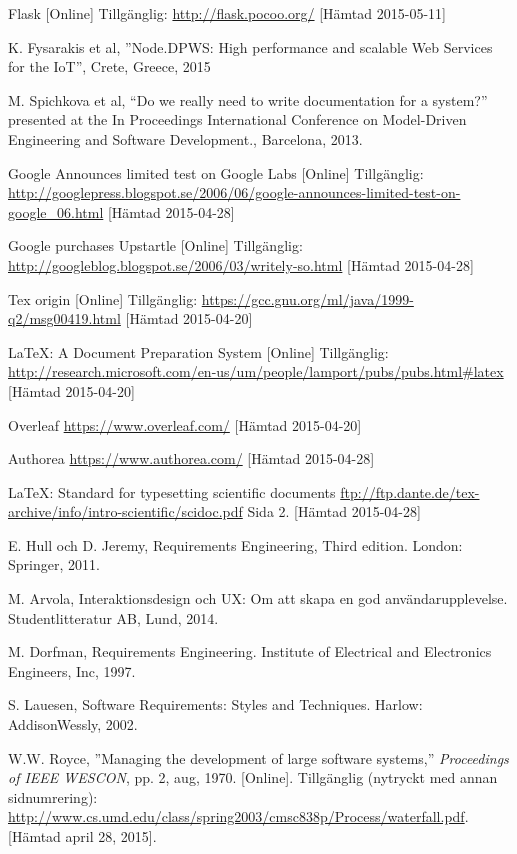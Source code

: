 \begin{thebibliography}{9}
Flask [Online] Tillgänglig:
\url{http://flask.pocoo.org/}
[Hämtad 2015-05-11]
	
K. Fysarakis et al, ''Node.DPWS: High performance and scalable Web Services for the IoT'', Crete, Greece, 2015


M. Spichkova et al, “Do we really need to write documentation for a system?” presented at the In Proceedings International Conference on Model-Driven Engineering and Software Development., Barcelona, 2013.

Google Announces limited test on Google Labs [Online] Tillgänglig: 
\url{http://googlepress.blogspot.se/2006/06/google-announces-limited-test-on-google_06.html} [Hämtad 2015-04-28]

Google purchases Upstartle [Online] Tillgänglig: 
\url{http://googleblog.blogspot.se/2006/03/writely-so.html} [Hämtad 2015-04-28]

Tex origin [Online] Tillgänglig: 
\url{https://gcc.gnu.org/ml/java/1999-q2/msg00419.html} [Hämtad 2015-04-20]

LaTeX: A Document Preparation System [Online] Tillgänglig: 
\url{http://research.microsoft.com/en-us/um/people/lamport/pubs/pubs.html#latex} [Hämtad 2015-04-20]

Overleaf 
\url{https://www.overleaf.com/} [Hämtad 2015-04-20]

Authorea 
\url{https://www.authorea.com/} [Hämtad 2015-04-28]
 
LaTeX: Standard for typesetting scientific documents
\url{ftp://ftp.dante.de/tex-archive/info/intro-scientific/scidoc.pdf} Sida 2. [Hämtad 2015-04-28]


E. Hull och D. Jeremy, Requirements Engineering, Third edition. London: Springer, 2011.

M. Arvola, Interaktionsdesign och UX: Om att skapa en god användarupplevelse. Studentlitteratur AB, Lund, 2014.

M. Dorfman, Requirements Engineering. Institute of Electrical and Electronics Engineers, Inc, 1997.

S. Lauesen, Software Requirements: Styles and Techniques. Harlow: AddisonWessly, 2002.


W.W. Royce, ''Managing the development of large software systems,''
\textit{Proceedings of IEEE WESCON}, pp. 2, aug, 1970.
[Online].
Tillgänglig (nytryckt med annan sidnumrering):
\url{http://www.cs.umd.edu/class/spring2003/cmsc838p/Process/waterfall.pdf}.
[Hämtad april 28, 2015].


\end{thebibliography}
